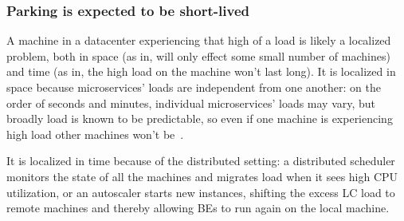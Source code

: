 \subsubsection{Parking is expected to be short-lived}
A machine in a datacenter experiencing that high of a load is likely a localized
problem, both in space (as in, will only effect some small number of machines)
and time (as in, the high load on the machine won't last long). It is localized
in space because microservices' loads are independent from one another: on the
order of seconds and minutes, individual microservices' loads may vary, but
broadly load is known to be predictable, so even if one machine is experiencing
high load other machines won't be~\cite{TODO}. 

It is localized in time because of the distributed setting: a distributed
scheduler monitors the state of all the machines and migrates load when it sees
high CPU utilization, or an autoscaler starts new instances, shifting the excess
LC load to remote machines and thereby allowing BEs to run again on the local
machine.